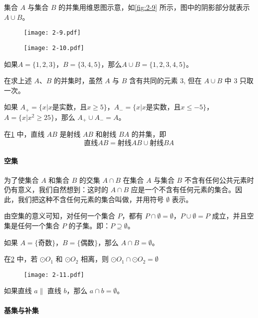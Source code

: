 集合 $A$ 与集合 $B$ 的并集用维恩图示意，如\cref{fig:2-9} 所示，图中的阴影部分就表示 $A\cup B$。

\begin{figure}
	\begin{minipage}[b]{0.48\linewidth}
		\centering
		\texttt{[image: 2-9.pdf]}
		\caption{}\label{fig:2-9}
	\end{minipage}
	\begin{minipage}[b]{0.48\linewidth}
		\centering
		\texttt{[image: 2-10.pdf]}
		\caption{}\label{fig:2-10}
	\end{minipage}
\end{figure}

如果$A=\{1, 2, 3\}$，$B=\{3, 4, 5\}$，那么$A\cup B= \{1, 2, 3, 4, 5\}$。

\begin{rmk}
	在求上述 $A$、$B$ 的并集时，虽然 $A$ 与 $B$ 含有共同的元素 3, 但在 $A\cup B$ 中 3 只取一次。
\end{rmk}

如果 $A_+=\{x|x\text{是实数，且}x\ge 5\}$，$A_-=\{x|x\text{是实数，且}x\le -5\}$，$A=\{x|x^2\ge 25\}$，那么 $A_+\cup A_-=A$。

在\cref{fig:2-10} 中，直线 $AB$ 是射线 $AB$ 和射线 $BA$ 的并集，即
\[\text{直线}AB=\text{射线}AB \cup \text{射线}BA\]

\paragraph{空集}
为了使集合 $A$ 和集合 $B$ 的交集 $A\cap B$ 在集合 $A$ 与集合 $B$ 不含有任何公共元素时仍有意义，我们自然想到：这时的 $A\cap B$ 应是一个不含有任何元素的集合。因此，我们把这种不含任何元素的集合叫做，并用符号 $\emptyset$ 表示。

由空集的意义可知，对任何一个集合 $P$，都有 $P\cap \emptyset=\emptyset$，$P\cup\emptyset=P$ 成立，并且空集是任何一个集合 $P$ 的子集。即：$P\supseteq \emptyset$。

如果 $A=\{\text{奇数}\}$，$B=\{\text{偶数}\}$，那么 $A\cap B=\emptyset$。

在\cref{fig:2-11} 中，若 $\odot O_1$ 和 $\odot O_2$ 相离，则 $\odot O_1\cap \odot O_2=\emptyset$
\begin{figure}[htp]
	\centering
	\texttt{[image: 2-11.pdf]}
	\caption{}\label{fig:2-11}
\end{figure}

如果直线 $a\parallel$ 直线 $b$，那么 $a\cap b=\emptyset$。

\paragraph{基集与补集}

